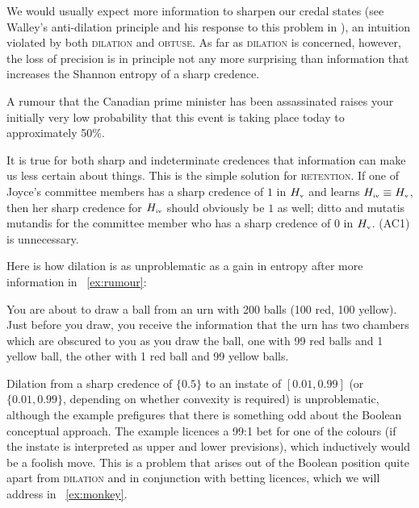 \documentclass[phd,12pt,oneside]{ubcthesis}
\begin{document}
We would usually expect more information to sharpen our credal states
(see Walley's anti-dilation principle and his response to this problem
in ), an intuition violated by both
\textsc{dilation} and \textsc{obtuse}. As far as \textsc{dilation} is
concerned, however, the loss of precision is in principle not any more
surprising than information that increases the Shannon entropy of a
sharp credence.

\begin{quotex}
  \label{ex:rumour} A rumour that the Canadian prime
  minister has been assassinated raises your initially very low
  probability that this event is taking place today to approximately
  50\%.
\end{quotex}

It is true for both sharp and indeterminate credences that information
can make us less certain about things. This is the simple solution for
\textsc{retention}. If one of Joyce's committee members has a sharp
credence of $1$ in $H_{\mbox{\tiny{v}}}$ and learns
$H_{\mbox{\tiny{iv}}}\equiv{}H_{\mbox{\tiny{v}}}$, then her sharp
credence for $H_{\mbox{\tiny{iv}}}$ should obviously be $1$ as well;
ditto and mutatis mutandis for the committee member who has a sharp
credence of $0$ in $H_{\mbox{\tiny{v}}}$. (AC1) is unnecessary.

Here is how dilation is as unproblematic as a gain in entropy after
more information in {\xample}~\ref{ex:rumour}:

\begin{quotex}
  \label{ex:urns} You are about to draw a ball
  from an urn with 200 balls (100 red, 100 yellow). Just before you
  draw, you receive the information that the urn has two chambers
  which are obscured to you as you draw the ball, one with 99 red
  balls and 1 yellow ball, the other with 1 red ball and 99 yellow
  balls.
\end{quotex}

Dilation from a sharp credence of $\{0.5\}$ to an instate of
$[0.01,0.99]$ (or $\{0.01,0.99\}$, depending on whether convexity is
required) is unproblematic, although the example prefigures that there
is something odd about the Boolean conceptual approach. The example
licences a 99:1 bet for one of the colours (if the instate is
interpreted as upper and lower previsions), which inductively would be
a foolish move. This is a problem that arises out of the Boolean
position quite apart from \textsc{dilation} and in conjunction with
betting licences, which we will address in {\xample}~\ref{ex:monkey}.
\end{document}
